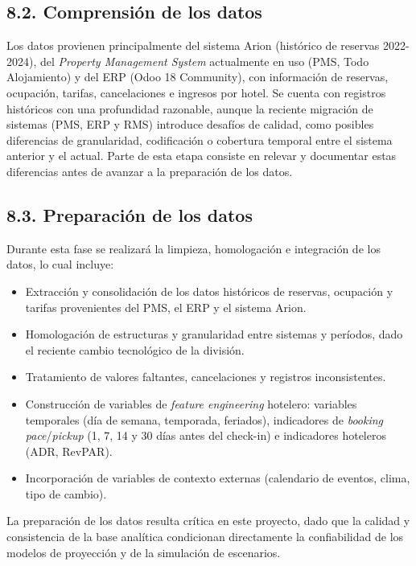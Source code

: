 \documentclass[
11pt, %
]{charter}
\begin{document}
\subsection*{8.2. Comprensión de los datos}
Los datos provienen principalmente del sistema Arion (histórico de reservas 2022-2024), del \textit{Property Management System} actualmente en uso (PMS, Todo Alojamiento) y del ERP (Odoo 18 Community), con información de reservas, ocupación, tarifas, cancelaciones e ingresos por hotel. Se cuenta con registros históricos con una profundidad razonable, aunque la reciente migración de sistemas (PMS, ERP y RMS) introduce desafíos de calidad, como posibles diferencias de granularidad, codificación o cobertura temporal entre el sistema anterior y el actual. Parte de esta etapa consiste en relevar y documentar estas diferencias antes de avanzar a la preparación de los datos.

\subsection*{8.3. Preparación de los datos}
Durante esta fase se realizará la limpieza, homologación e integración de los datos, lo cual incluye:
\begin{itemize}
  \item Extracción y consolidación de los datos históricos de reservas, ocupación y tarifas provenientes del PMS, el ERP y el sistema Arion.
  \item Homologación de estructuras y granularidad entre sistemas y períodos, dado el reciente cambio tecnológico de la división.
  \item Tratamiento de valores faltantes, cancelaciones y registros inconsistentes.
  \item Construcción de variables de \textit{feature engineering} hotelero: variables temporales (día de semana, temporada, feriados), indicadores de \textit{booking pace}/\textit{pickup} (1, 7, 14 y 30 días antes del check-in) e indicadores hoteleros (ADR, RevPAR).
  \item Incorporación de variables de contexto externas (calendario de eventos, clima, tipo de cambio).
\end{itemize}
La preparación de los datos resulta crítica en este proyecto, dado que la calidad y consistencia de la base analítica condicionan directamente la confiabilidad de los modelos de proyección y de la simulación de escenarios.
\end{document}
